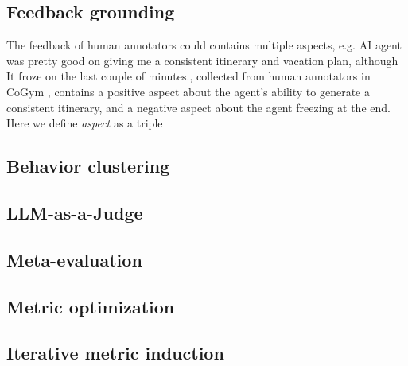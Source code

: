 \subsection{Feedback grounding}
\label{sec:grounding}
The feedback of human annotators could contains multiple aspects, e.g. \textsf{AI agent was pretty good
on giving me a consistent itinerary and vacation plan, although It froze on the last couple of minutes.},
collected from human annotators in CoGym \citep{shao2024collaborative}, contains a positive aspect
about the agent's ability to generate a consistent itinerary, and a negative aspect about the agent freezing
at the end. Here we define \emph{aspect} as a triple 

\subsection{Behavior clustering}
\label{sec:clustering}

\subsection{LLM-as-a-Judge}
\label{sec:llm-judge}

\subsection{Meta-evaluation}
\label{sec:meta-evaluation}

\subsection{Metric optimization}
\label{sec:metric-optimization}

\subsection{Iterative metric induction}
\label{sec:iterative-induction}